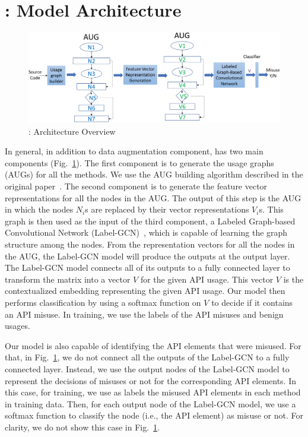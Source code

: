\section{{\tool}: Model Architecture}
\label{sec:overview}

\begin{figure}[t]
\begin{center}
\includegraphics[width=5.6in]{overview.png}
\vspace{-5pt}
\caption{{\tool}: Architecture Overview}
\label{fig:overview}
\end{center}
\end{figure}

In general, in addition to data augmentation component, {\tool} has
two main components (Fig.~\ref{fig:overview}). The first component is
to generate the usage graphs (AUGs) for all the methods. We use the
AUG building algorithm described in the original
paper~\cite{msr19}. The second component is to generate the feature
vector representations for all the nodes in the AUG. The output of
this step is the AUG in which the nodes $N_i$s are replaced by their
vector representations $V_i$s. This graph is then used as the input of
the third component, a Labeled Graph-based Convolutional Network
(Label-GCN)~\cite{label-gcn}, which is capable of learning the graph
structure among the nodes. From the representation vectors for all the
nodes in the AUG, the Label-GCN model will produce the outputs at the
output layer. The Label-GCN model connects all of its outputs to a
fully connected layer to transform the matrix into a vector $V$ for
the given API usage. This vector $V$ is the contextualized embedding
representing the given API usage. Our model then performs
classification by using a softmax function on $V$ to decide if it
contains an API misuse. In training, we use the labels of the API
misuses and benign usages.

Our model is also capable of identifying the API elements that were
misused. For that, in Fig.~\ref{fig:overview}, we do not connect all
the outputs of the Label-GCN to a fully connected layer. Instead, we
use the output nodes of the Label-GCN model to represent the decisions
of misuses or not for the corresponding API elements. In this case,
for training, we use as labels the misused API elements in each method
in training data. Then, for each output node of the Label-GCN model,
we use a softmax function to classify the node (i.e., the API element)
as misuse or not. For clarity, we do not show this case in
Fig.~\ref{fig:overview}.

